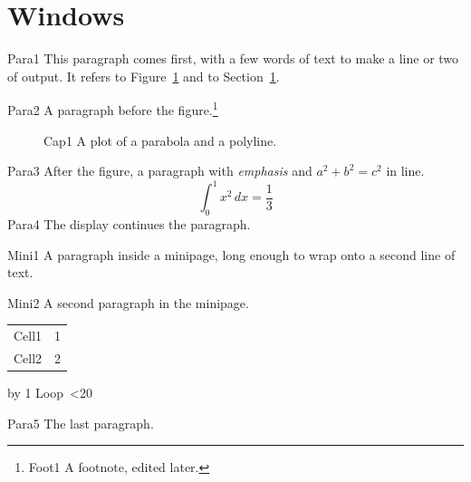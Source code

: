 \documentclass{article}
\begin{document}
\section{Windows}\label{sec:one}
Para1 This paragraph comes first, with a few words of text to make a line
or two of output. It refers to Figure~\ref{fig:plot} and to
Section~\ref{sec:one}.

Para2 A paragraph before the figure.\footnote{Foot1 A footnote, edited
later.}

\begin{figure}[ht]
  \centering
  \caption{Cap1 A plot of a parabola and a polyline.}\label{fig:plot}
\end{figure}

Para3 After the figure, a paragraph with \emph{emphasis} and
$a^2+b^2=c^2$ in line.
\[ \int_0^1 x^2\,dx = \frac13 \]
Para4 The display continues the paragraph.

\noindent\begin{minipage}{0.5\textwidth}
Mini1 A paragraph inside a minipage, long enough to wrap onto a second
line of text.

Mini2 A second paragraph in the minipage.
\end{minipage}

\begin{tabular}{lr}
Cell1 & 1 \\
Cell2 & 2 \\
\end{tabular}

\newcount\n {}
\loop\advance\n by 1 Loop\the\n\ \ifnum\n<20 \repeat


Para5 The last paragraph.
\end{document}
